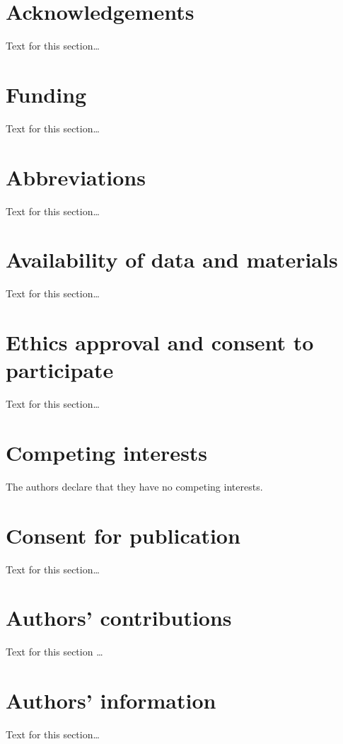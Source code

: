 \documentclass{bmcart}
\begin{document}
\begin{backmatter}

\section*{Acknowledgements}%
Text for this section\ldots

\section*{Funding}%
Text for this section\ldots

\section*{Abbreviations}%
Text for this section\ldots

\section*{Availability of data and materials}%
Text for this section\ldots

\section*{Ethics approval and consent to participate}%
Text for this section\ldots

\section*{Competing interests}
The authors declare that they have no competing interests.

\section*{Consent for publication}%
Text for this section\ldots

\section*{Authors' contributions}
Text for this section \ldots

\section*{Authors' information}%
Text for this section\ldots


\end{backmatter}
\end{document}
